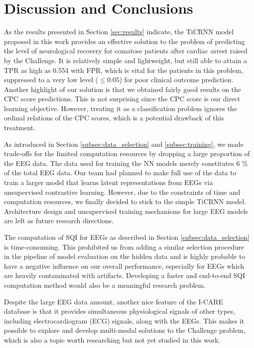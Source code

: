 \section{Discussion and Conclusions}
\label{sec:discu}


As the results presented in Section \ref{sec:results} indicate, the TiCRNN model proposed in this work provides an effective solution to the problem of predicting the level of neurological recovery for comatose patients after cardiac arrest raised by the Challenge. It is relatively simple and lightweight, but still able to attain a TPR as high as 0.554 with FPR, which is vital for the patients in this problem, suppressed to a very low level ($\le 0.05$) for poor clinical outcome prediction. Another highlight of our solution is that we obtained fairly good results on the CPC score predictions. This is not surprising since the CPC score is our direct learning objective. However, treating it as a classification problem ignores the ordinal relations of the CPC scores, which is a potential drawback of this treatment.

As introduced in Section \ref{subsec:data_selection} and \ref{subsec:training}, we made trade-offs for the limited computation resources by dropping a large proportion of the EEG data. The data used for training the NN models merely constitutes 6 \% of the total EEG data. Our team had planned to make full use of the data to train a larger model that learns latent representations from EEGs via unsupervised contrastive learning. However, due to the constraints of time and computation resources, we finally decided to stick to the simple TiCRNN model. Architecture design and unsupervised training mechanisms for large EEG models are left as future research directions.

The computation of SQI for EEGs as described in Section \ref{subsec:data_selection} is time-consuming. This prohibited us from adding a similar selection procedure in the pipeline of model evaluation on the hidden data and is highly probable to have a negative influence on our overall performance, especially for EEGs which are heavily contaminated with artifacts. Developing a faster and end-to-end SQI computation method would also be a meaningful research problem.

Despite the large EEG data amount, another nice feature of the I-CARE database is that it provides simultaneous physiological signals of other types, including electrocardiogram (ECG) signals, along with the EEGs. This makes it possible to explore and develop multi-modal solutions to the Challenge problem, which is also a topic worth researching but not yet studied in this work.
